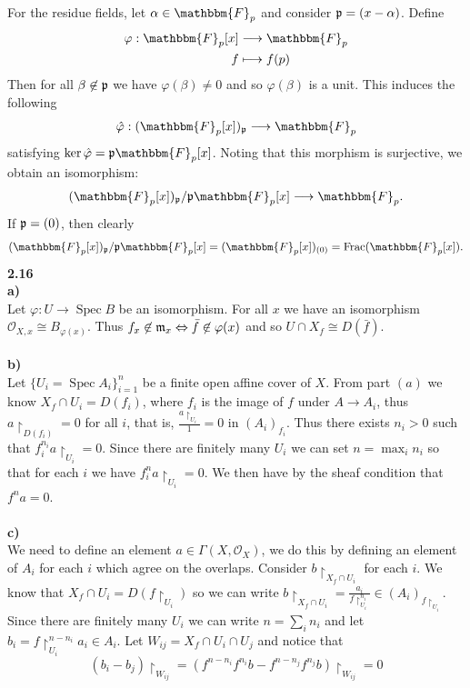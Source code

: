 \documentclass[12pt]{article}
\numberwithin{thm}{subsection}
\numberwithin{defn}{subsection}
\numberwithin{lemma}{subsection}
\numberwithin{example}{subsection}
\numberwithin{notation}{subsection}
\numberwithin{cor}{subsection}
\numberwithin{remark}{subsection}
\numberwithin{condition}{subsection}
\numberwithin{question}{subsection}
\numberwithin{construction}{subsection}
\numberwithin{construction}{subsection}
\numberwithin{construction}{subsection}
\newcommand{\call}[1]{\mathcal{#1}}
\newcommand{\lto}{\longrightarrow}
\begin{document}
For the residue fields, let $\alpha \in \mathbbm{F}_p$ and consider $\frak{p} = (x-\alpha)$. Define
\begin{align*}
    \varphi: \mathbbm{F}_p[x] &\lto \mathbbm{F}_p\\
    f &\longmapsto f(p)
\end{align*}
Then for all $\beta \not\in \frak{p}$ we have $\varphi(\beta) \neq 0$ and so $\varphi(\beta)$ is a unit. This induces the following
\begin{align*}
    \hat{\varphi}: (\mathbbm{F}_p[x])_{\frak{p}} &\lto \mathbbm{F}_p\\
\end{align*}
satisfying $\ker\hat{\varphi} = \frak{p}\mathbbm{F}_p[x]$. Noting that this morphism is surjective, we obtain an isomorphism:
\begin{align*}
    (\mathbbm{F}_p[x])_{\frak{p}}/\frak{p}\mathbbm{F}_p[x] \lto \mathbbm{F}_p.
\end{align*}
If $\frak{p} = (0)$, then clearly
\begin{equation}
    (\mathbbm{F}_p[x])_{\frak{p}}/\frak{p}\mathbbm{F}_p[x] = (\mathbbm{F}_p[x])_{(0)} = \operatorname{Frac}(\mathbbm{F}_p[x]).
\end{equation}
%
\textbf{2.16}\\
\textbf{a)}\\
Let $\varphi: U \lto \operatorname{Spec}B$ be an isomorphism. For all $x$ we have an isomorphism $\call{O}_{X,x} \cong B_{\varphi(x)}$. Thus $f_x \not\in \frak{m}_x \Leftrightarrow \bar{f} \not\in \varphi(x)$ and so $U \cap X_f \cong D(\bar{f})$.\\\\
%
\textbf{b)}\\
Let $\lbrace U_i = \operatorname{Spec}A_i\rbrace_{i= 1}^n$ be a finite open affine cover of $X$. From part $(a)$ we know $X_f \cap U_i = D(f_i)$, where $f_i$ is the image of $f$ under $A \lto A_i$, thus $a\restriction_{D(f_i)} = 0$ for all $i$, that is, $\frac{a\restriction_{U_i}}{1} = 0$ in $(A_i)_{f_i}$. Thus there exists $n_i >0$ such that $f_i^{n_i}a\restriction_{U_i} = 0$. Since there are finitely many $U_i$ we can set $n = \max_i{n_i}$ so that for each $i$ we have $f_i^n a\restriction_{U_i} = 0$. We then have by the sheaf condition that $f^n a= 0$.\\\\
%
\textbf{c)}\\
We need to define an element $a \in \Gamma(X,\call{O}_X)$, we do this by defining an element of $A_i$ for each $i$ which agree on the overlaps. Consider $b\restriction_{X_f \cap U_i}$ for each $i$. We know that $X_f \cap U_i = D(f\restriction_{U_i})$ so we can write $b\restriction_{X_f \cap U_i} = \frac{a_i}{f\restriction_{U_i}^{n_i}} \in (A_i)_{f\restriction_{U_i}}$. Since there are finitely many $U_i$ we can write $n = \sum_i n_i$ and let $b_i = f\restriction_{U_i}^{n-n_i} a_i \in A_i$. Let $W_{ij} = X_f \cap U_i \cap U_j$ and notice that \[(b_i - b_j)\restriction_{W_{ij}} = (f^{n-n_i}f^{n_i}b-f^{n-n_j}f^{n_j}b)\restriction_{W_{ij}} = 0\]
\end{document}
